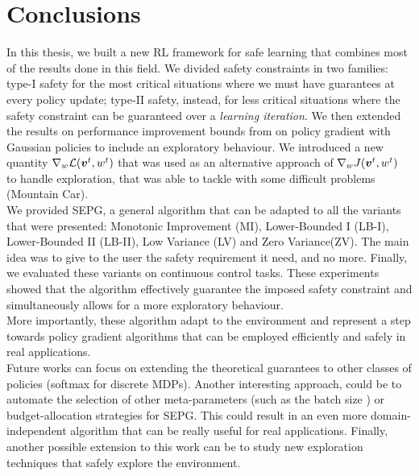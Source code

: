 \chapter{Conclusions}
\label{ch:conclusion}
\thispagestyle{empty}

In this thesis, we built a new RL framework for safe learning that combines most of the results done in this field. We divided safety constraints in two families: type-I safety for the most critical situations where we must have guarantees at every policy update; type-II safety, instead, for less critical situations where the safety constraint can be guaranteed over a \textit{learning iteration}. 
We then extended the results on performance improvement bounds from \cite{adaptive_batch,adaptive_step} on policy gradient with Gaussian policies to include an exploratory behaviour. We introduced a new quantity $\nabla_{w}\mathcal{L}(\boldsymbol{v}^t, w^t)$ that was used as an alternative approach of $\nabla_w J(\boldsymbol{v}^t, w^t)$ to handle exploration, that was able to tackle with some difficult problems (Mountain Car).\\
We provided SEPG, a general algorithm that can be adapted to all the variants that were presented: Monotonic Improvement (MI), Lower-Bounded I (LB-I), Lower-Bounded II (LB-II), Low Variance (LV) and Zero Variance(ZV). The main idea was to give to the user the safety requirement it need, and no more. Finally, we evaluated these variants on continuous control tasks. These experiments showed that the algorithm effectively guarantee the imposed safety constraint and simultaneously allows for a more exploratory behaviour. \\
More importantly, these algorithm adapt to the environment and represent a step towards policy gradient algorithms that can be employed efficiently and safely in real applications. \\
Future works can focus on extending the theoretical guarantees to other classes of policies (\eg softmax for discrete MDPs). Another interesting approach, could be to automate the selection of other meta-parameters (such as the batch size \cite{adaptive_batch}) or budget-allocation strategies for SEPG. This could result in an even more domain-independent algorithm that can be really useful for real applications. Finally, another possible extension to this work can be to study new exploration techniques that safely explore the environment. 


